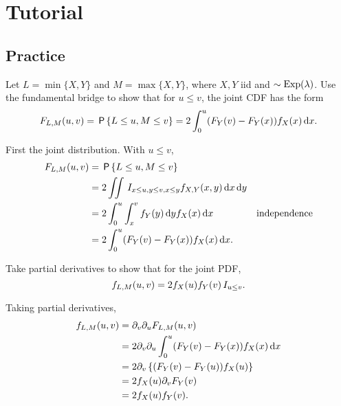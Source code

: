 \section{Tutorial}
\label{sec:tutorial}


\subsection{Practice}

\begin{exercise}
Let $L=\min\{X, Y\}$ and $M=\max\{X, Y\}$, where $X, Y$ iid and $\sim \mathrm{Exp}(\lambda)$.
Use the fundamental bridge to show that for $u\leq v$, the joint CDF has the form
\begin{equation*}
  F_{L,M}(u,v) = \,\mathsf{P}\left\{L\leq u, M\leq v\right\} = 2\int_0^u (F_Y(v)- F_Y(x)) f_X(x) \,\textrm{d}x.
\end{equation*}
\begin{solution}
First the joint distribution. With $u\leq v$,
  \begin{align*}
F_{L,M}(u,v) &= \,\mathsf{P}\left\{L\leq u, M \leq v\right\} \\
&= 2\iint \,I_{x \leq u, y\leq v, x\leq y} f_{X,Y}(x,y)\,\textrm{d}x \,\textrm{d}y \\
&= 2\int_0^u \int_x^v f_Y(y) \,\textrm{d}y f_X(x) \,\textrm{d}x & \text{independence} \\
&= 2\int_0^u (F_Y(v)- F_Y(x)) f_X(x) \,\textrm{d}x.
  \end{align*}
\end{solution}
\end{exercise}


\begin{exercise}\label{ex:25}
Take partial derivatives to show that for the joint PDF,
\begin{equation*}
f_{L,M}(u,v) = 2f_X(u) f_Y(v)\,I_{u\leq v}.
\end{equation*}
\begin{solution}
Taking partial derivatives,
\begin{align*}
f_{L,M}(u,v)
&=\partial_v\partial_{u}F_{L,M}(u,v) \\
&=2 \partial_v\partial_{u} \int_0^u (F_Y(v)- F_Y(x)) f_X(x) \,\textrm{d}x  \\
&=2 \partial_v \left\{(F_Y(v)- F_Y(u)) f_X(u) \right \}  \\
&=2 f_X(u)\partial_v F_Y(v)  \\
&=2 f_X(u)f_Y(v).
\end{align*}
\end{solution}
\end{exercise}


